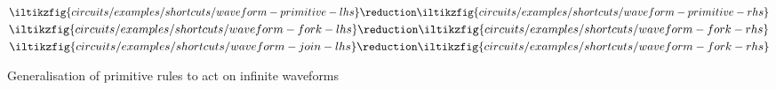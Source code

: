 \begin{figure}
    \centering
    \(
    \iltikzfig{circuits/examples/shortcuts/waveform-primitive-lhs}
    \reduction
    \iltikzfig{circuits/examples/shortcuts/waveform-primitive-rhs}
    \)
    \quad
    \(
    \iltikzfig{circuits/examples/shortcuts/waveform-fork-lhs}
    \reduction
    \iltikzfig{circuits/examples/shortcuts/waveform-fork-rhs}
    \)
    \quad
    \(
    \iltikzfig{circuits/examples/shortcuts/waveform-join-lhs}
    \reduction
    \iltikzfig{circuits/examples/shortcuts/waveform-fork-rhs}
    \)
    \caption{Generalisation of primitive rules to act on infinite waveforms}
    \label{fig:waveform-rules}
\end{figure}